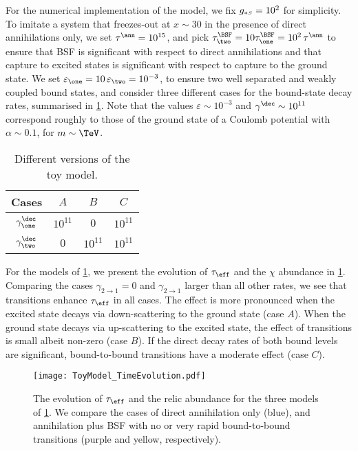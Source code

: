 \documentclass[preprint,5p,twocolumn]{elsarticle}
\begin{document}
For the numerical implementation of the model, we fix $g_{*\mathsmaller{S}} = 10^2$ for simplicity. To imitate a system that freezes-out at $x\sim 30$ in the presence of direct annihilations only, we set $\tau^{\ann}=10^{15}$, and pick $\tau_{\two}^{\BSF} =  10 \tau_{\one}^{\BSF}=10^2 \, \tau^{\ann}$ to ensure that BSF is significant with respect to direct annihilations and that capture to excited states is significant with respect to capture to the ground state. We set 
$\varepsilon_{\one} = 10\,\varepsilon_{\two} = 10^{-3}$, 
to ensure two well separated and weakly coupled bound states, and consider three different cases for the bound-state decay rates, summarised in \cref{tab:ToyModels}. Note that the values $\varepsilon \sim 10^{-3}$ and $\gamma^{\dec} \sim 10^{11}$ correspond roughly to those of the ground state of a Coulomb potential with $\alpha \sim 0.1$, for $m\sim \TeV$.
%
\begin{table}[h]
\centering	
\renewcommand{\arraystretch}{1.3}
\begin{tabular}{|c|c|c|c|}
\hline	
Cases	&$A$	&$B$	&$C$
\\ \hline 
$\gamma_{\one}^{\dec}$ &$10^{11}$ 	&0 			&$10^{11}$	 
\\ \hline
$\gamma_{\two}^{\dec}$ &0 			&$10^{11}$ 	&$10^{11}$ 
\\ \hline
\end{tabular}
\caption{Different versions of the toy model. \label{tab:ToyModels}}
\end{table}


For the models of \cref{tab:ToyModels}, we present the evolution of $\tau_{\eff}$ and the $\chi$ abundance in \cref{fig:ToyModel_TimeEvolution}. Comparing the cases $\gamma_{2\to1} =0$ and $\gamma_{2\to1}$ larger than all other rates, we see that transitions enhance $\tau_{\eff}$ in all cases. The effect is more pronounced when the excited state decays via down-scattering to the ground state (case $A$). When the ground state decays via up-scattering to the excited state, the effect of transitions is small albeit non-zero (case $B$). If the direct decay rates of both bound levels are significant, bound-to-bound transitions have a moderate effect (case $C$). 
%
\begin{figure}[h!]
\centering
\texttt{[image: ToyModel\_TimeEvolution.pdf]}
\caption{The evolution of $\tau_{\eff}$ and the relic abundance for the three models of \cref{tab:ToyModels}. We compare the cases of direct annihilation only (blue), and annihilation plus BSF with no or very rapid bound-to-bound transitions (purple and yellow, respectively).}
\label{fig:ToyModel_TimeEvolution}
\end{figure}
\end{document}
